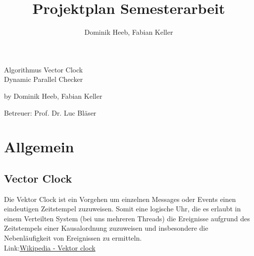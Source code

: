 \documentclass[10pt,a4paper]{article}
\author{Dominik Heeb, Fabian Keller}
\title{Projektplan Semesterarbeit}
\begin{document}
\begin{titlepage}
	\begin{Huge}
		\begin{center}
				Algorithmus Vector Clock \\Dynamic Parallel Checker\\[2.0cm]
		\end{center}
	\end{Huge}
	
	\begin{center}
		\begin{Large}
				by Dominik Heeb, Fabian Keller\\[1.0cm]
		\end{Large}
		\begin{large}
				Betreuer: Prof. Dr. Luc Bläser
		\end{large}
	\end{center}
\end{titlepage}

\newpage
\tableofcontents 
\newpage

\section{Allgemein}
\subsection{Vector Clock}
\begin{flushleft}
Die Vektor Clock ist ein Vorgehen um einzelnen Messages oder Events einen eindeutigen Zeitstempel zuzuweisen. Somit eine logische Uhr, die es erlaubt in einem Verteilten System (bei uns mehreren Threads) die Ereignisse aufgrund des Zeitstempels einer Kausalordnung zuzuweisen und insbesondere die Nebenläufigkeit von Ereignissen zu ermitteln.
\\[0.5cm]Link:\href{https://de.wikipedia.org/wiki/Vektoruhr}{Wikipedia - Vektor clock}
\end{flushleft}
\end{document}
